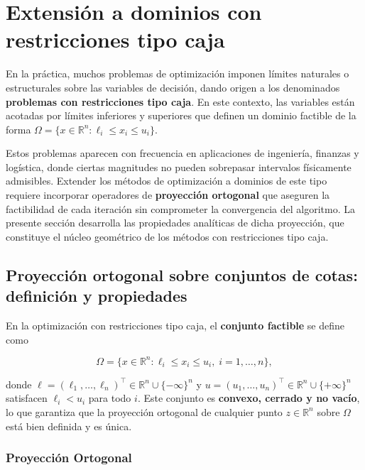 \documentclass[
  spanish,
  us-letterpaper,
]{scrreprt}
\numberwithin{equation}{section}
\begin{document}
\section{Extensión a dominios con restricciones tipo
caja}\label{extensiuxf3n-a-dominios-con-restricciones-tipo-caja}

En la práctica, muchos problemas de optimización imponen límites
naturales o estructurales sobre las variables de decisión, dando origen
a los denominados \textbf{problemas con restricciones tipo caja}. En
este contexto, las variables están acotadas por límites inferiores y
superiores que definen un dominio factible de la forma
\(\Omega = \{x \in \mathbb{R}^n : \ell_i \le x_i \le u_i\}\).

Estos problemas aparecen con frecuencia en aplicaciones de ingeniería,
finanzas y logística, donde ciertas magnitudes no pueden sobrepasar
intervalos físicamente admisibles. Extender los métodos de optimización
a dominios de este tipo requiere incorporar operadores de
\textbf{proyección ortogonal} que aseguren la factibilidad de cada
iteración sin comprometer la convergencia del algoritmo. La presente
sección desarrolla las propiedades analíticas de dicha proyección, que
constituye el núcleo geométrico de los métodos con restricciones tipo
caja.

\subsection{Proyección ortogonal sobre conjuntos de cotas: definición y
propiedades}\label{proyecciuxf3n-ortogonal-sobre-conjuntos-de-cotas-definiciuxf3n-y-propiedades}

En la optimización con restricciones tipo caja, el \textbf{conjunto
factible} se define como

\[
\Omega = \{x \in \mathbb{R}^n : \ell_i \le x_i \le u_i,\; i = 1,\dots,n\},
\]

donde
\(\ell = (\ell_1,\dots,\ell_n)^\top \in \mathbb{R}^n \cup \{-\infty\}^n\)
y \(u = (u_1,\dots,u_n)^\top \in \mathbb{R}^n \cup \{+\infty\}^n\)
satisfacen \(\ell_i < u_i\) para todo \(i\). Este conjunto es
\textbf{convexo, cerrado y no vacío}, lo que garantiza que la proyección
ortogonal de cualquier punto \(z \in \mathbb{R}^n\) sobre \(\Omega\)
está bien definida y es única.

\subsubsection{Proyección Ortogonal}\label{proyecciuxf3n-ortogonal}
\end{document}
